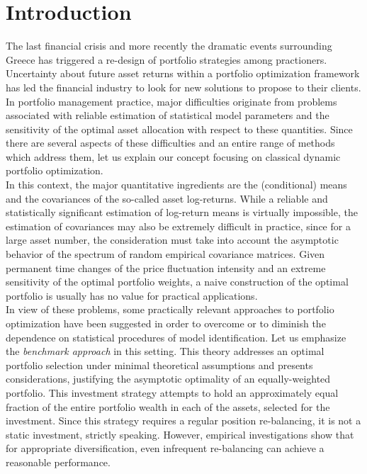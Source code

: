 \section{Introduction \label{sec:intro}}

The last financial crisis and more recently the dramatic events surrounding Greece has triggered a re-design of portfolio strategies among practioners. Uncertainty about future asset returns within a portfolio optimization framework has led the financial industry to look for new solutions to propose to their clients.\\

In   portfolio management practice, major  difficulties originate from problems associated with reliable  estimation of statistical model parameters and the sensitivity of the optimal asset allocation with respect to these quantities. 
Since there are several aspects of these difficulties and an entire range of methods which  address them, let us explain our concept focusing on classical dynamic portfolio optimization. \\

In this context, the major quantitative ingredients are the (conditional) means and the covariances  of the so-called asset log-returns.  While a reliable and statistically significant estimation of log-return means is virtually impossible,  the estimation of covariances may also be extremely difficult in practice, since for a large asset number, the consideration  must take into account the  asymptotic behavior of the spectrum of random empirical covariance matrices. Given permanent time changes of  the price fluctuation intensity and an extreme sensitivity of the optimal portfolio weights, a naive construction of the  optimal portfolio is usually  has no value for practical applications.\\
 
In view of these problems, some practically relevant  approaches to  portfolio optimization have been suggested in order to overcome or to  diminish the dependence on statistical procedures of  model identification. Let us emphasize the  {\it benchmark approach} in this setting. This theory addresses an  optimal portfolio selection  under minimal theoretical assumptions and presents considerations, justifying the asymptotic optimality of an equally-weighted portfolio. This investment strategy attempts to hold an approximately equal fraction  of the entire portfolio wealth in each of the assets, selected for the investment. 
Since  this strategy requires a regular position re-balancing, it is  not a static investment, strictly speaking. However, empirical investigations show that for appropriate diversification, even infrequent re-balancing can achieve a  reasonable performance.\\
 
